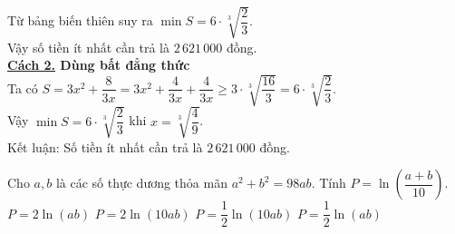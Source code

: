 \begin{ex}
{\begin{center}
\begin{tikzpicture}
			\end{tikzpicture}
		\end{center}
		Từ bảng biến thiên suy ra $\min S= 6\cdot \sqrt[3]{\dfrac{2}{3}}$.\\
		Vậy số tiền ít nhất cần trả là $2\,621\,000$ đồng.\\
		\textbf{\underline{Cách 2.} Dùng bất đẳng thức} \\
		Ta có $S=3x^2+\dfrac{8}{3x}=3x^2+\dfrac{4}{3x}+\dfrac{4}{3x}\geq 3\cdot \sqrt[3]{\dfrac{16}{3}}=6\cdot \sqrt[3]{\dfrac{2}{3}}$.\\
		Vậy $\min S= 6\cdot \sqrt[3]{\dfrac{2}{3}}$ khi $x=\sqrt[3]{\dfrac{4}{9}}$.\\
		Kết luận: Số tiền ít nhất cần trả là $2\,621\,000$ đồng.
	}
\end{ex}

\begin{ex}%
	Cho $a,b$ là các số thực dương thỏa mãn $a^2+b^2=98ab$. Tính $P=\ln \left( \dfrac{a+b}{10}\right)$.
	\choice
	{$P=2\ln(ab) $}
	{ $P=2\ln(10ab) $}
	{$P=\dfrac{1}{2}\ln(10ab) $}
	{\True  $P=\dfrac{1}{2}\ln(ab) $}
\end{ex}

